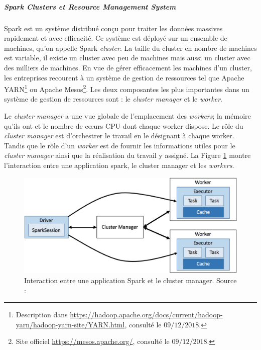 \subparagraph{Spark Clusters et Resource Management System}

Spark est un système distribué conçu pour traiter les données massives rapidement et avec efficacité. Ce système est déployé sur un ensemble de machines, qu'on appelle Spark \textit{cluster}. La taille du cluster en nombre de machines est variable, il existe un cluster avec peu de machines mais aussi un cluster avec des milliers de machines. En vue de gérer efficacement les machines d'un cluster, les entreprises recourent à un système de gestion de ressources tel que Apache YARN\footnote{Description dans \url{https://hadoop.apache.org/docs/current/hadoop-yarn/hadoop-yarn-site/YARN.html}, consulté le $09/12/2018$.} ou Apache Mesos\footnote{Site officiel \url{https://mesos.apache.org/}, consulté le $09/12/2018$.}. Les deux composantes les plus importantes dans un système de gestion de ressources sont : le \textit{cluster manager} et le \textit{worker}.

Le \textit{cluster manager} a une vue globale de l'emplacement des \textit{workers}; la mémoire qu'ils ont et le nombre de c\oe{}urs CPU dont chaque worker dispose. Le rôle du \textit{cluster manager} est d'orchestrer le travail en le désignant à chaque worker. Tandis que le rôle d'un \textit{worker} est de fournir les informations utiles pour le \textit{cluster manager} ainsi que la réalisation du travail y assigné. La Figure \ref{fig:cluster-overview} montre l'interaction entre une application spark, le cluster manager et les \textit{workers}.


\begin{figure}[H]
	\centering
	\captionsetup{justification= centering}
	\includegraphics[width=0.7\linewidth]{illustrations/cluster-overview.jpg}
	\caption{ Interaction entre une application Spark et le cluster manager. Source : \cite{eginning-Apache-Spark-2-cluster-overwiew}}
	\label{fig:cluster-overview}
\end{figure}




